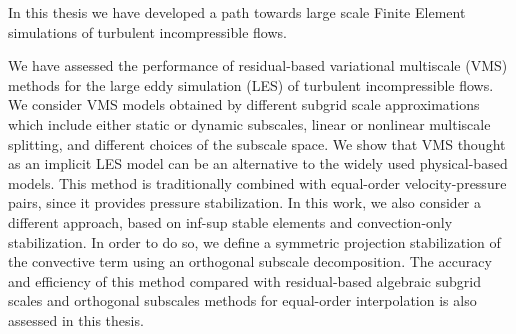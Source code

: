 %
%
%
%


In this thesis we have developed a path towards large scale Finite Element simulations of turbulent incompressible flows. 

We have assessed the performance of residual-based variational multiscale (VMS) methods for the large eddy simulation (LES) of turbulent incompressible flows. We consider VMS models obtained by different subgrid scale approximations which include either static or dynamic subscales, linear or nonlinear multiscale splitting, and different choices of the subscale space. We show that VMS thought as an implicit LES model can be an alternative to the widely used physical-based models. This method is traditionally combined with equal-order velocity-pressure pairs, since it provides pressure stabilization. In this work, we also consider a different approach, based on inf-sup stable elements and convection-only stabilization. In order to do so, we define a symmetric projection stabilization of the convective term
using an orthogonal subscale decomposition. The accuracy and efficiency of this method compared with residual-based algebraic subgrid scales and orthogonal subscales methods for equal-order interpolation is also assessed in this thesis. 

